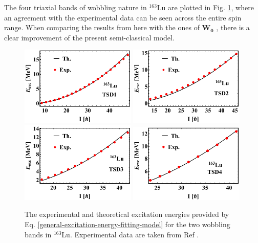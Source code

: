 The four triaxial bands of wobbling nature in $^{163}$Lu are plotted in Fig. \ref{excitation-energies-th-163Lu}, where an agreement with the experimental data can be seen across the entire spin range. When comparing the results from here with the ones of $\mathbf{W_0}$ \cite{raduta2017semiclassical}, there is a clear improvement of the present semi-classical model.
\begin{figure}
    \centering
    \includegraphics[width=0.49\textwidth]{Chapters/Figures/Lu-exp-energies/fig3a_lu163.pdf}
    \includegraphics[width=0.49\textwidth]{Chapters/Figures/Lu-exp-energies/fig3b_lu163.pdf}
    \includegraphics[width=0.49\textwidth]{Chapters/Figures/Lu-exp-energies/fig3c_lu163.pdf}
    \includegraphics[width=0.49\textwidth]{Chapters/Figures/Lu-exp-energies/fig3d_lu163.pdf}
    \caption{The experimental and theoretical excitation energies provided by Eq. \ref{general-excitation-energy-fitting-model} for the two wobbling bands in $^{163}$Lu. Experimental data are taken from Ref \cite{reich2010nuclear}.}
    \label{excitation-energies-th-163Lu}
\end{figure}

